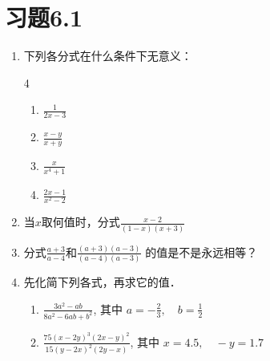 \section*{习题6.1}
\begin{enumerate}
    \item 下列各分式在什么条件下无意义：
 \begin{multicols}{4}
 \begin{enumerate}
     \item $\frac{1}{2x-3}$
     \item $\frac{x-y}{x+y}$
     \item $\frac{x}{x^4+1}$
     \item $\frac{2x-1}{x^2-2}$
 \end{enumerate}
 \end{multicols}
    \item 当$x$取何值时，分式$\frac{x-2}{(1-x)(x+3)}$
    \begin{enumerate}
    \end{enumerate}
\item 分式$\frac{a+3}{a-4}$和$\frac{(a+3)(a-3)}{(a-4)(a-3)}$
的值是不是永远相等？
\item 先化简下列各式，再求它的值．
\begin{enumerate}
    \item $\frac{3 a^{2}-a b}{8 a^{2}-6 a b+b^{2}}$, 其中 $a=- \frac{2}{3}, \quad b=\frac{1}{2}$
    \item  $\frac{75(x-2 y)^{3}(2 x-y)^{2}}{15(y-2 x)^{2}(2 y-x)}$, 其中 $x=4.5,\quad -y=1.7$
\end{enumerate}


\end{enumerate}
